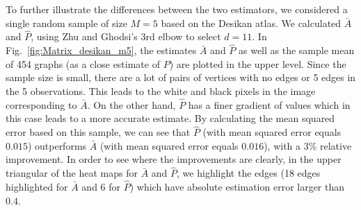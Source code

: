 \documentclass[10pt,letterpaper]{article}
\renewcommand{\hat}{\widehat}
\begin{document}





To further illustrate the differences between the two estimators, we considered a single random sample of size $M=5$ based on the Desikan atlas.
We calculated $\bar{A}$ and $\hat{P}$, using  Zhu and Ghodsi's 3rd elbow to select $d=11$. 
In Fig.~\ref{fig:Matrix_desikan_m5}, the estimates $\bar{A}$ and $\hat{P}$ as well as the sample mean of 454 graphs (as a close estimate of $P$) are plotted in the upper level. 
Since the sample size is small, there are a lot of pairs of vertices with no edges or 5 edges in the 5 observations.
This leads to the white and black pixels in the image corresponding to $\bar{A}$.
On the other hand, $\hat{P}$ has a finer gradient of values which in this case leads to a more accurate estimate.
By calculating the mean squared error based on this sample, we can see that $\hat{P}$ (with mean squared error equals $0.015$) outperforms $\bar{A}$ (with mean squared error equals $0.016$), with a 3\% relative improvement.
In order to see where the improvements are clearly, in the upper triangular of the heat maps for $\bar{A}$ and $\hat{P}$, we highlight the edges (18 edges highlighted for $\bar{A}$ and 6 for $\hat{P}$) which have absolute estimation error larger than $0.4$.
\end{document}
